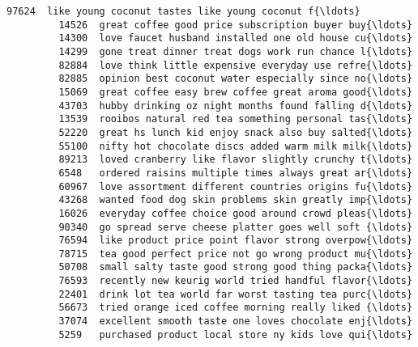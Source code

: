 \documentclass[11pt]{article}
\begin{document}
\begin{Verbatim}[commandchars=\\\{\}]
         97624  like young coconut tastes like young coconut f{\ldots}   
         14526  great coffee good price subscription buyer buy{\ldots}   
         14300  love faucet husband installed one old house cu{\ldots}   
         14299  gone treat dinner treat dogs work run chance l{\ldots}   
         82884  love think little expensive everyday use refre{\ldots}   
         82885  opinion best coconut water especially since no{\ldots}   
         15069  great coffee easy brew coffee great aroma good{\ldots}   
         43703  hubby drinking oz night months found falling d{\ldots}   
         13539  rooibos natural red tea something personal tas{\ldots}   
         52220  great hs lunch kid enjoy snack also buy salted{\ldots}   
         55100  nifty hot chocolate discs added warm milk milk{\ldots}   
         89213  loved cranberry like flavor slightly crunchy t{\ldots}   
         6548   ordered raisins multiple times always great ar{\ldots}   
         60967  love assortment different countries origins fu{\ldots}   
         43268  wanted food dog skin problems skin greatly imp{\ldots}   
         16026  everyday coffee choice good around crowd pleas{\ldots}   
         90340  go spread serve cheese platter goes well soft {\ldots}   
         76594  like product price point flavor strong overpow{\ldots}   
         78715  tea good perfect price not go wrong product mu{\ldots}   
         50708  small salty taste good strong good thing packa{\ldots}   
         76593  recently new keurig world tried handful flavor{\ldots}   
         22401  drink lot tea world far worst tasting tea purc{\ldots}   
         56673  tried orange iced coffee morning really liked {\ldots}   
         37074  excellent smooth taste one loves chocolate enj{\ldots}   
         5259   purchased product local store ny kids love qui{\ldots}   
         

\end{Verbatim}
\end{document}
